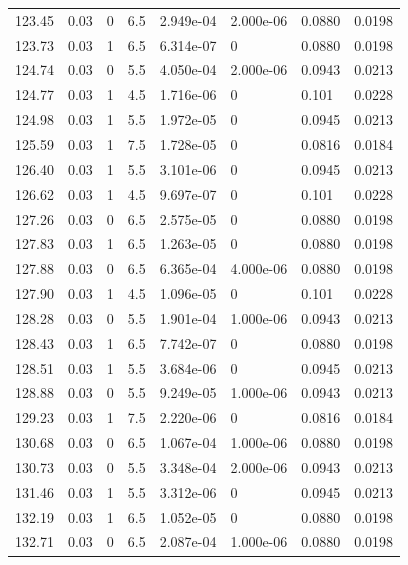 \documentclass[preview]{standalone}
\begin{document}
{{\begin{tabular}{L{1.2cm}C{1.2cm} C{0.3cm}C{0.5cm} C{1.4cm}C{1.4cm} C{1.4cm}C{1.4cm}}
  123.45  &  0.03  & 0     & 6.5 &  2.949e-04  & 2.000e-06  & 0.0880 &  0.0198   \\ 
  123.73  &  0.03  & 1     & 6.5 &  6.314e-07  & 0  & 0.0880 &  0.0198   \\ 
  124.74  &  0.03  & 0     & 5.5 &  4.050e-04  & 2.000e-06  & 0.0943 &  0.0213   \\ 
  124.77  &  0.03  & 1     & 4.5 &  1.716e-06  & 0  & 0.101 &  0.0228   \\ 
  124.98  &  0.03  & 1     & 5.5 &  1.972e-05  & 0  & 0.0945 &  0.0213   \\ 
  125.59  &  0.03  & 1     & 7.5 &  1.728e-05  & 0  & 0.0816 &  0.0184   \\ 
  126.40  &  0.03  & 1     & 5.5 &  3.101e-06  & 0  & 0.0945 &  0.0213   \\ 
  126.62  &  0.03  & 1     & 4.5 &  9.697e-07  & 0  & 0.101 &  0.0228   \\ 
  127.26  &  0.03  & 0     & 6.5 &  2.575e-05  & 0  & 0.0880 &  0.0198   \\ 
  127.83  &  0.03  & 1     & 6.5 &  1.263e-05  & 0  & 0.0880 &  0.0198   \\ 
  127.88  &  0.03  & 0     & 6.5 &  6.365e-04  & 4.000e-06  & 0.0880 &  0.0198   \\ 
  127.90  &  0.03  & 1     & 4.5 &  1.096e-05  & 0  & 0.101 &  0.0228   \\ 
  128.28  &  0.03  & 0     & 5.5 &  1.901e-04  & 1.000e-06  & 0.0943 &  0.0213   \\ 
  128.43  &  0.03  & 1     & 6.5 &  7.742e-07  & 0  & 0.0880 &  0.0198   \\ 
  128.51  &  0.03  & 1     & 5.5 &  3.684e-06  & 0  & 0.0945 &  0.0213   \\ 
  128.88  &  0.03  & 0     & 5.5 &  9.249e-05  & 1.000e-06  & 0.0943 &  0.0213   \\ 
  129.23  &  0.03  & 1     & 7.5 &  2.220e-06  & 0  & 0.0816 &  0.0184   \\ 
  130.68  &  0.03  & 0     & 6.5 &  1.067e-04  & 1.000e-06  & 0.0880 &  0.0198   \\ 
  130.73  &  0.03  & 0     & 5.5 &  3.348e-04  & 2.000e-06  & 0.0943 &  0.0213   \\ 
  131.46  &  0.03  & 1     & 5.5 &  3.312e-06  & 0  & 0.0945 &  0.0213   \\ 
  132.19  &  0.03  & 1     & 6.5 &  1.052e-05  & 0  & 0.0880 &  0.0198   \\ 
  132.71  &  0.03  & 0     & 6.5 &  2.087e-04  & 1.000e-06  & 0.0880 &  0.0198   \\ 

\end{tabular}}}
\end{document}
